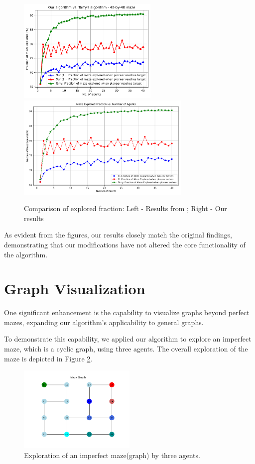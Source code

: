 \begin{figure}[H]
    \centering
    \includegraphics[height=5cm]{Cap3/arthur_tarry_40x40_fraction.pdf}
    \includegraphics[height=5cm]{Cap3/self_fraction_40_by_40_tarry.pdf}
    \caption{Comparison of explored fraction: Left - Results from ; Right - Our results}
\label{fig_comparison_fraction}
\end{figure}

As evident from the figures, our results closely match the original findings,
demonstrating that our modifications have not altered the core functionality of the algorithm.

\section{Graph Visualization}
\label{section_result_graph_visualization}

One significant enhancement is the capability to visualize graphs
beyond perfect mazes, expanding our algorithm's applicability to general graphs.

To demonstrate this capability, we applied our algorithm to explore
an imperfect maze, which is a cyclic graph, using three agents. The overall exploration of the maze is depicted in Figure \ref{fig_imperfect_maze_exploration}.

\begin{figure}[H]
\centering
\includegraphics[width=0.5\textwidth]{Cap3/maze_imperfect_exploration.png}
\caption{Exploration of an imperfect maze(graph) by three agents.}
\label{fig_imperfect_maze_exploration}
\end{figure}

